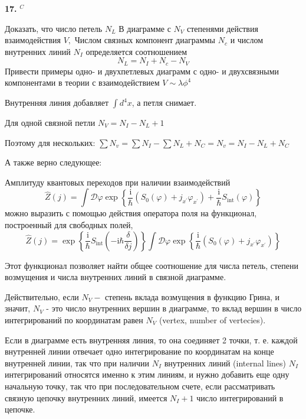 \documentclass[a4paper,12pt]{article} %
\begin{document}
\begin{ttask}\textbf{17. }$^{C}$ 

Доказать, что число петель $N_{L}$ В диаграмме с $N_{V}$ степенями действия взаимодействия $V,$ Числом связных компонент диаграммы $N_{c}$ и числом внутренних линий $N_{I}$ определяется соотношением
$$
N_{L}=N_{I}+N_{c}-N_{V}
$$
Привести примеры одно- и двухпетлевых диаграмм с одно- и двухсвязными компонентами в теории с взаимодействием $V \sim \lambda \phi^{4}$




Внутренняя линия добавляет $ \int d^4 x$, а петля снимает.

Для одной связной петли $ N_V=N_I-N_L+1 $


Поэтому для нескольких: $ \sum N_v=\sum N_I - \sum N_L +N_C = N_v=N_I-N_L+N_C $






А также верно следующее:




Амплитуду квантовых переходов при наличии взаимодействий
$$
\hat{Z}(j)=\int \mathcal{D} \varphi \exp \left\{
\frac{\mathrm{i}}{\hbar}\left(S_{0}(\varphi)+j_{x^{\prime}} 
\varphi_{x^{\prime}}\right)
+
\frac{\mathrm{i}}{\hbar} S_{\mathrm{int}}(\varphi)\right\}
$$
можно выразить с помощью действия оператора поля на функционал, построенный для свободных полей,
$$
\hat{Z}(j)=\exp \left\{\frac{\mathrm{i}}{\hbar} S_{\mathrm{int}}\left(-\mathrm{i} \hbar \frac{\delta}{\delta j}\right)\right\} 
\int \mathcal{D} \varphi 
\exp \left\{
\frac{\mathrm{i}}{\hbar}\left(
S_{0}(\varphi)
+
j_{x^{\prime}} \varphi_{x^{\prime}}
\right)
\right\}
$$


Этот функционал позволяет найти общее соотношение для числа петель, 
степени возмущения и числа внутренних линий в связной диаграмме. 

Действительно, если $N_{V}-$ степень вклада возмущения в функцию Грина, 
и значит, $N_{V}$ - это число внутренних вершин в диаграмме, 
то вклад вершин в число 
интегрирований по координатам равен $N_{V}$ (vertex, number of vertecies).

Если в диаграмме есть внутренняя линия, то она соединяет 2 точки, т. е. 
каждой внутренней линии отвечает одно интегрирование по координатам на конце внутренней линии, 
так что при наличии $N_{I}$ внутренних линий (internal lines) $N_{I}$ интегрирований относятся именно к этим линиям, 
и нужно добавить еще одну начальную точку, так что при последовательном счете, 
если рассматривать связную цепочку внутренних линий, 
имеется $N_{I}+1$ число интегрирований в цепочке. 


\end{ttask}
\end{document}
